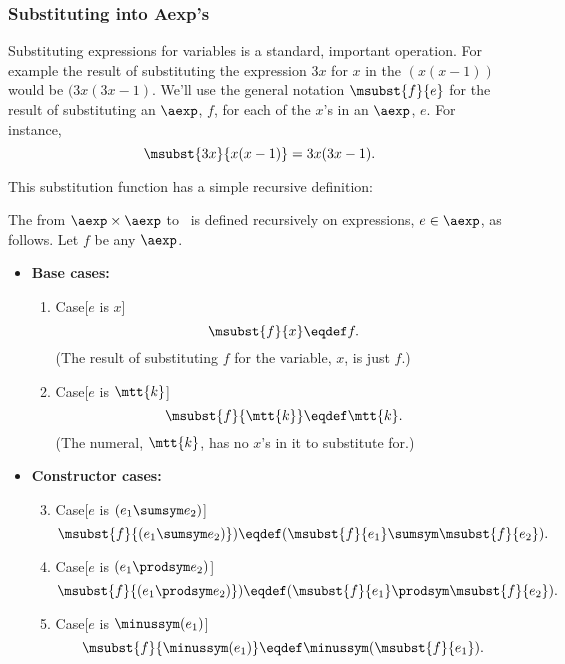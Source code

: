 \begin{definition}
\subsubsection{Substituting into Aexp's}
Substituting expressions for variables is a standard, important
operation.  For example the result of substituting the expression $3x$ for $x$
in the $(x(x-1))$ would be $(3x(3x-1)$.  We'll use the general
notation $\msubst{f}{e}$ for the result of substituting an $\aexp$, $f$,
for each of the $x$'s in an $\aexp$, $e$.  For instance,
\[
\msubst{3x}{x(x-1)} = 3x(3x-1).
\]

This substitution function has a simple recursive definition:

\begin{definition}\label{subst-def}
  The  from $\aexp \times \aexp$ to \aexp\ is
  defined recursively on expressions, $e \in \aexp$, as follows.  Let $f$
  be any $\aexp$.

\begin{itemize}
\item \textbf{Base cases:}

\begin{enumerate}

\item\label{subst-var} Case[$e$ is $x$]
\[
\msubst{f}{x} \eqdef f.
\]
(The result of substituting $f$ for the variable, $x$, is just $f$.)

\item\label{subst-const} Case[$e$ is $\mtt{k}$]
\[
\msubst{f}{\mtt{k}} \eqdef \mtt{k}.
\]
(The numeral, $\mtt{k}$, has no $x$'s in it to substitute for.)

\end{enumerate}

\item \textbf{Constructor cases:}

\begin{enumerate}
\setcounter{enumi}{2}
\item\label{subst-sum} Case[$e$ is $(e_1 \sumsym e_2)$]
\[
\msubst{f}{(e_1 \sumsym e_2)}) \eqdef  (\msubst{f}{e_1} \sumsym
\msubst{f}{e_2}).
\]

\item\label{subst-prod} Case[$e$ is $(e_1 \prodsym e_2)$]
\[
\msubst{f}{(e_1 \prodsym e_2)}) \eqdef  (\msubst{f}{e_1} \prodsym
\msubst{f}{e_2}).
\]

\item\label{subst-minus} Case[$e$ is $\minussym(e_1)$]
\[
\msubst{f}{\minussym(e_1)} \eqdef \minussym (\msubst{f}{e_1}).
\]


\end{enumerate}
\end{itemize}
\end{definition}
\end{definition}

